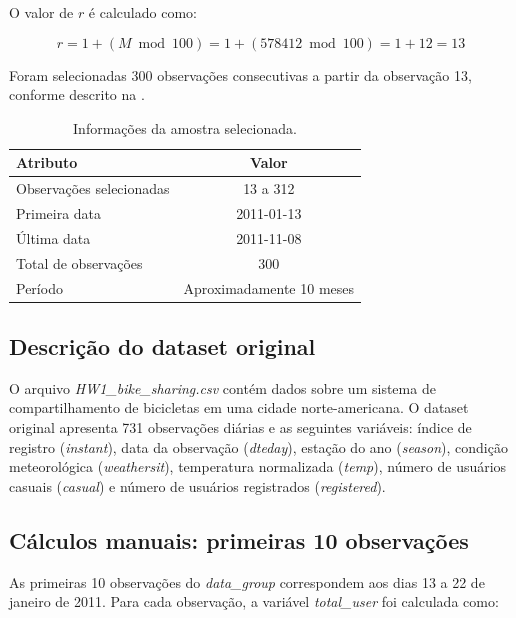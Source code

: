 \documentclass[12pt,a4paper]{article}
\begin{document}
O valor de $r$ é calculado como:

\begin{equation}
r = 1 + (M \bmod 100) = 1 + (578412 \bmod 100) = 1 + 12 = 13
\end{equation}

Foram selecionadas 300 observações consecutivas a partir da observação 13, conforme descrito na .

\begin{table}[H]
    \centering
    \caption{Informações da amostra selecionada.}
    \label{tab:amostra_info}
    \begin{tabular}{lc}
        \toprule
        \textbf{Atributo} & \textbf{Valor} \\
        \midrule
        Observações selecionadas & 13 a 312 \\
        Primeira data & 2011-01-13 \\
        Última data & 2011-11-08 \\
        Total de observações & 300 \\
        Período & Aproximadamente 10 meses \\
        \bottomrule
    \end{tabular}
\end{table}

\subsection{Descrição do dataset original}

O arquivo \textit{HW1\_bike\_sharing.csv} contém dados sobre um sistema de compartilhamento de bicicletas em uma cidade norte-americana. O dataset original apresenta 731 observações diárias e as seguintes variáveis: índice de registro (\textit{instant}), data da observação (\textit{dteday}), estação do ano (\textit{season}), condição meteorológica (\textit{weathersit}), temperatura normalizada (\textit{temp}), número de usuários casuais (\textit{casual}) e número de usuários registrados (\textit{registered}).

\subsection{Cálculos manuais: primeiras 10 observações}

As primeiras 10 observações do \textit{data\_group} correspondem aos dias 13 a 22 de janeiro de 2011. Para cada observação, a variável \textit{total\_user} foi calculada como:
\end{document}
